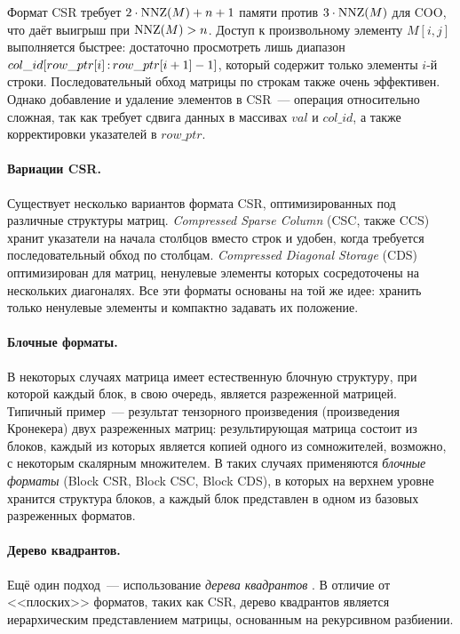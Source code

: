 Формат CSR требует $2 \cdot \operatorname{NNZ}(M) + n + 1$ памяти против $3 \cdot \operatorname{NNZ}(M)$ для COO, что даёт выигрыш при $\operatorname{NNZ}(M) > n$.
Доступ к произвольному элементу $M[i,j]$ выполняется быстрее: достаточно просмотреть лишь диапазон $col\_id[row\_ptr[i] \rng row\_ptr[i+1]-1]$, который содержит только элементы $i$-й строки.
Последовательный обход матрицы по строкам также очень эффективен.
Однако добавление и удаление элементов в CSR~--- операция относительно сложная, так как требует сдвига данных в массивах $val$ и $col\_id$, а также корректировки указателей в $row\_ptr$.

\paragraph{Вариации CSR.}
Существует несколько вариантов формата CSR, оптимизированных под различные структуры матриц.
\emph{Compressed Sparse Column} (CSC, также CCS) хранит указатели на начала столбцов вместо строк и удобен, когда требуется последовательный обход по столбцам.
\emph{Compressed Diagonal Storage} (CDS) оптимизирован для матриц, ненулевые элементы которых сосредоточены на нескольких диагоналях.
Все эти форматы основаны на той же идее: хранить только ненулевые элементы и компактно задавать их положение.

\paragraph{Блочные форматы.}
В некоторых случаях матрица имеет естественную блочную структуру, при которой каждый блок, в свою очередь, является разреженной матрицей.
Типичный пример~--- результат тензорного произведения (произведения Кронекера) двух разреженных матриц: результирующая матрица состоит из блоков, каждый из которых является копией одного из сомножителей, возможно, с некоторым скалярным множителем.
В таких случаях применяются \emph{блочные форматы} (Block CSR, Block CSC, Block CDS), в которых на верхнем уровне хранится структура блоков, а каждый блок представлен в одном из базовых разреженных форматов.

\paragraph{Дерево квадрантов.}
Ещё один подход~--- использование \emph{дерева квадрантов}%
%
.
В отличие от <<плоских>> форматов, таких как CSR, дерево квадрантов является иерархическим представлением матрицы, основанным на рекурсивном разбиении.

